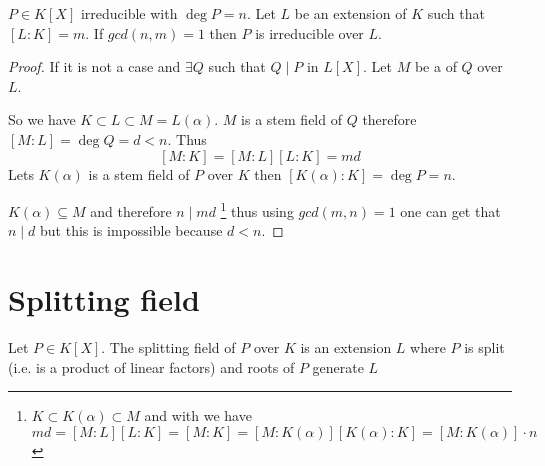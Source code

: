\begin{corollary}
  $P \in K\left[X\right]$ irreducible with $\deg P = n$. Let $L$ be an
  extension of $K$ such that $\left[L:K\right] = m$.
  If $gcd\left(n,m\right) = 1$ then $P$ is irreducible over $L$.
  \label{cor:lec2_2}
  \begin{proof}
    If it is not a case and $\exists Q$ such that $Q \mid P$ in
    $L\left[X\right]$. Let $M$ be a  of $Q$
    over $L$.

    So we have $K \subset L \subset M = L\left(\alpha\right)$. $M$ is
    a stem field of $Q$ therefore $\left[M:L\right] = \deg Q = d < n$. Thus
    \[
    \left[M:K\right] = \left[M:L\right] \left[L:K\right]  =
    m d
    \]
    Lets $K\left(\alpha\right)$ is a stem field of $P$ over $K$ then
    $\left[K\left(\alpha\right):K\right] = \deg P = n$.

    $K\left(\alpha\right) \subseteq M$ and therefore $n \mid md$
    \footnote{
      $K \subset K\left( \alpha \right) \subset M$ and with
       we have
      \[
      md = \left[M : L \right] \left[L : K \right] =
      \left[M : K \right] =
      \left[M : K\left( \alpha \right) \right]
      \left[K\left( \alpha \right) : K \right] =
      \left[M : K\left( \alpha \right) \right] \cdot n
      \]
    }
    thus
    using $gcd(m,n)=1$ one can get that $n \mid d$ but this is
    impossible because $d < n$.
  \end{proof}
\end{corollary}


\section{Splitting field}

\begin{definition}
  Let $P \in K\left[X\right]$.
  The splitting field of $P$ over $K$ is an extension $L$ where $P$ is
  split (i.e. is a product of linear factors) and roots of $P$
  generate $L$
  \label{def:splittingfield}
\end{definition}

